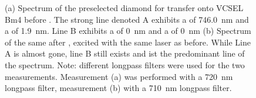 \begin{figure}[tp]
\begin{subfigure}[t]{ 0.49\linewidth}
		\end{subfigure}
		\caption{(a) Spectrum of the preselected diamond for transfer onto VCSEL Bm4 before \pp. The strong line denoted A exhibits a \cwl of \SI{746.0}{nm} and a \lw of \SI{1.9}{nm}. Line B exhibits a \cwl of \SI{0}{nm} and a \lw of \SI{0}{nm}  (b) Spectrum of the same \siv after \pp, excited with the same laser as before. While Line A is almost gone, line B still exists and ist the predominant line of the spectrum. Note: different longpass filters were used for the two measurements. Measurement (a) was performed with a \SI{720}{nm} longpass filter, measurement (b) with a \SI{710}{nm} longpass filter.}
		\label{fig::spectrum_vcsel_diamond}
	\end{figure}

	\begin{figure}[tp]
		\begin{subfigure}[t]{ 0.49\linewidth}
			\centering
			\caption{}
			\label{subfig::vcsel_excitation_with_diamond}
		\end{subfigure}
		\hfill
		\begin{subfigure}[t]{ 0.49\linewidth}
			\centering

\end{subfigure}
\end{figure}

